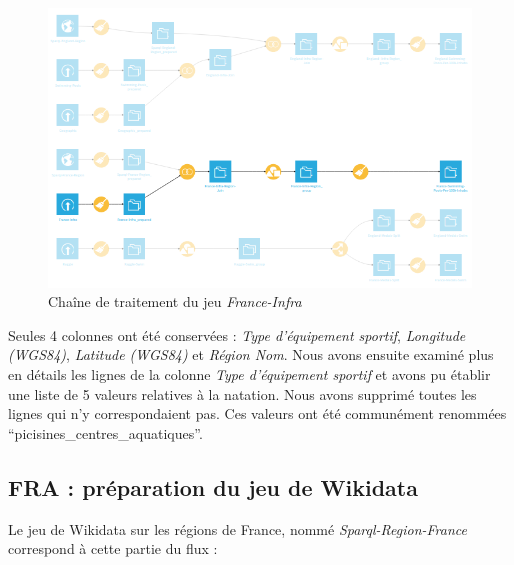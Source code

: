 \documentclass[hidelinks, 12pt]{report}
\begin{document}
\begin{center}
	\begin{figure}[H]
		\setlength{\belowcaptionskip}{-35pt}
		\includegraphics[scale=0.55]{images/flow-swim-fra-ministere.png}
		\caption{Chaîne de traitement du jeu \textit{France-Infra}}
	\end{figure}
\end{center}

Seules 4 colonnes ont été conservées : \textit{Type d'équipement sportif}, \textit{Longitude (WGS84)}, \textit{Latitude (WGS84)} et \textit{Région Nom}. Nous avons ensuite examiné plus en détails les lignes de la colonne \textit{Type d'équipement sportif} et avons pu établir une liste de 5 valeurs relatives à la natation. Nous avons supprimé toutes les lignes qui n'y correspondaient pas. Ces valeurs ont été communément renommées \enquote{picisines\_centres\_aquatiques}.





%





\subsection{FRA : préparation du jeu de Wikidata}

Le jeu de Wikidata sur les régions de France, nommé \textit{Sparql-Region-France} correspond à cette partie du flux :
\end{document}
